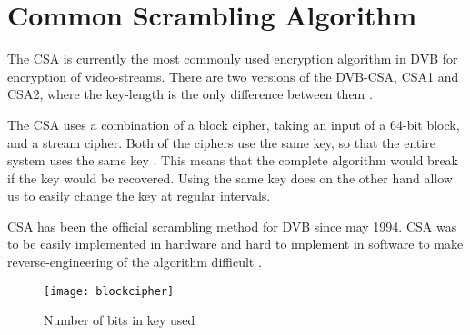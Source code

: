 \chapter{Common Scrambling Algorithm} \label{ch:CSA}
The CSA is currently the most commonly used encryption algorithm in DVB 
for encryption of video-streams. There are two versions of the DVB-CSA, 
CSA1 and CSA2, where the key-length is the only difference between them 
\citep[p. 23]{DVBScene:2013}. 

The CSA uses a combination of a block cipher, taking an input of a 
64-bit block, and a stream cipher. Both of the ciphers use the same 
key, so that the entire system uses the same key 
\citep[pp. 271--272]{WeiLi:2007}. This means that the complete 
algorithm would break if the key would be recovered. Using the same key 
does on the other hand allow us to easily change the key at regular 
intervals. 

CSA has been the official scrambling method for DVB since may 1994. CSA 
was to be easily implemented in hardware and hard to implement in 
software to make reverse-engineering of the algorithm difficult 
\citep{DVBScene:2013}.




\begin{figure}
  \begin{center}
    \texttt{[image: blockcipher]}
  \end{center}
  \caption{Number of bits in key used}
  \label{fig:blockcipher}
\end{figure}

